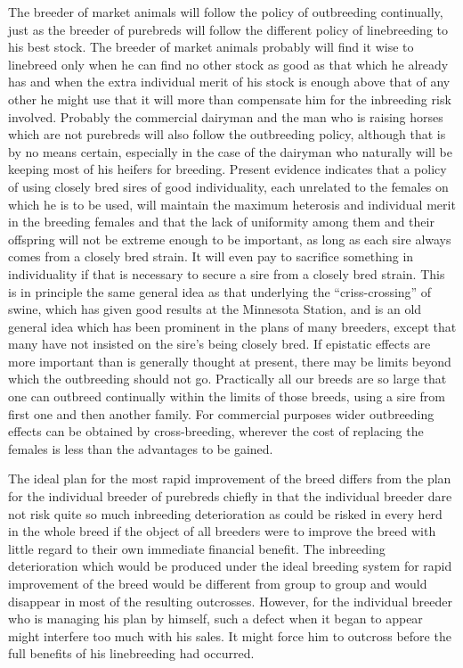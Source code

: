 The breeder of market animals will follow the policy of outbreeding
continually, just as the breeder of purebreds will follow the different
policy of linebreeding to his best stock. The breeder of market
animals probably will find it wise to linebreed only when he can find
no other stock as good as that which he already has and when the extra
individual merit of his stock is enough above that of any other he might
use that it will more than compensate him for the inbreeding risk
involved. Probably the commercial dairyman and the man who is raising
horses which are not purebreds will also follow the outbreeding
policy, although that is by no means certain, especially in the case of
the dairyman who naturally will be keeping most of his heifers for
breeding. Present evidence indicates that a policy of using closely bred
sires of good individuality, each unrelated to the females on which he is
to be used, will maintain the maximum heterosis and individual merit
in the breeding females and that the lack of uniformity among them
and their offspring will not be extreme enough to be important, as
long as each sire always comes from a closely bred strain. It will even
pay to sacrifice something in individuality if that is necessary to secure
a sire from a closely bred strain. This is in principle the same general
idea as that underlying the ``criss-crossing'' of swine, which has given
good results at the Minnesota Station, and is an old general idea which
has been prominent in the plans of many breeders, except that many
have not insisted on the sire's being closely bred. If epistatic effects are
more important than is generally thought at present, there may be limits
beyond which the outbreeding should not go. Practically all our
breeds are so large that one can outbreed continually within the limits
of those breeds, using a sire from first one and then another family. For
commercial purposes wider outbreeding effects can be obtained by
cross-breeding, wherever the cost of replacing the females is less than
the advantages to be gained.

The ideal plan for the most rapid improvement of the breed differs
from the plan for the individual breeder of purebreds chiefly in that the
individual breeder dare not risk quite so much inbreeding deterioration
as could be risked in every herd in the whole breed if the object of
all breeders were to improve the breed with little regard to their own
immediate financial benefit. The inbreeding deterioration which would
be produced under the ideal breeding system for rapid improvement of
the breed would be different from group to group and would disappear
in most of the resulting outcrosses. However, for the individual breeder
who is managing his plan by himself, such a defect when it began to
appear might interfere too much with his sales. It might force him to
outcross before the full benefits of his linebreeding had occurred.

